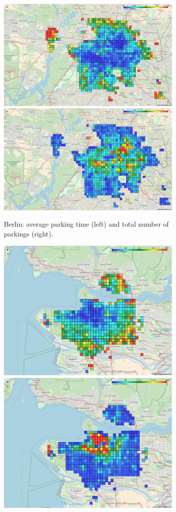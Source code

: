 \begin{figure}[t!]
    \begin{center}
        \begin{subfigure}{\textwidth}
		    \begin{center}
            \includegraphics[width=0.495\columnwidth]{figures/BerlinoAvgParking.pdf}
            \includegraphics[width=0.495\columnwidth]{figures/BerlinoMaxParking.pdf}                
            \captionsetup{justification=centering}
            \caption{Berlin: average parking time (left) and total number of  parkings (right).}
            \label{fig:heatmap_Berlin}
            \end{center}
        \end{subfigure}
        \begin{subfigure}{\textwidth}
		    \begin{center}
            \includegraphics[width=0.495\columnwidth]{figures/VancouverAvgParking.pdf}
            \includegraphics[width=0.495\columnwidth]{figures/VancouverMaxParking.pdf}

\end{center}
\end{subfigure}
\end{center}
\end{figure}
